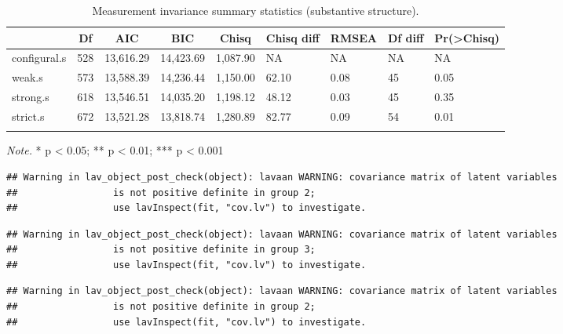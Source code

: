 \documentclass[
  man]{apa6}
\begin{document}
\begin{table}[tbp]

\begin{center}
\begin{threeparttable}

\caption{\label{tab:measinv.pilot.sub}Measurement invariance summary statistics (substantive structure).}

\begin{tabular}{lllllllll}
\toprule
 & \multicolumn{1}{c}{Df} & \multicolumn{1}{c}{AIC} & \multicolumn{1}{c}{BIC} & \multicolumn{1}{c}{Chisq} & \multicolumn{1}{c}{Chisq diff} & \multicolumn{1}{c}{RMSEA} & \multicolumn{1}{c}{Df diff} & \multicolumn{1}{c}{Pr(>Chisq)}\\
\midrule
configural.s & 528 & 13,616.29 & 14,423.69 & 1,087.90 & NA & NA & NA & NA\\
weak.s & 573 & 13,588.39 & 14,236.44 & 1,150.00 & 62.10 & 0.08 & 45 & 0.05\\
strong.s & 618 & 13,546.51 & 14,035.20 & 1,198.12 & 48.12 & 0.03 & 45 & 0.35\\
strict.s & 672 & 13,521.28 & 13,818.74 & 1,280.89 & 82.77 & 0.09 & 54 & 0.01\\
\bottomrule
\addlinespace
\end{tabular}

\begin{tablenotes}[para]
\normalsize{\textit{Note.} * p < 0.05; ** p < 0.01; *** p < 0.001}
\end{tablenotes}

\end{threeparttable}
\end{center}

\end{table}

\begin{verbatim}
## Warning in lav_object_post_check(object): lavaan WARNING: covariance matrix of latent variables
##                 is not positive definite in group 2;
##                 use lavInspect(fit, "cov.lv") to investigate.
\end{verbatim}

\begin{verbatim}
## Warning in lav_object_post_check(object): lavaan WARNING: covariance matrix of latent variables
##                 is not positive definite in group 3;
##                 use lavInspect(fit, "cov.lv") to investigate.
\end{verbatim}

\begin{verbatim}
## Warning in lav_object_post_check(object): lavaan WARNING: covariance matrix of latent variables
##                 is not positive definite in group 2;
##                 use lavInspect(fit, "cov.lv") to investigate.
\end{verbatim}
\end{document}
